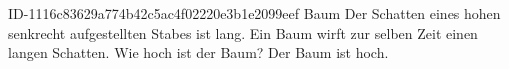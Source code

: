 \begin{exercise}
      {ID-1116c83629a774b42c5ac4f02220e3b1e2099eef}
      {Baum}
  \ifproblem\problem
    Der Schatten eines  hohen senkrecht aufgestellten Stabes ist
     lang. Ein Baum wirft zur selben Zeit einen 
    langen Schatten. Wie hoch ist der Baum?
  \fi
  \ifoutcome\outcome
    Der Baum ist  hoch.
  \fi
\end{exercise}
